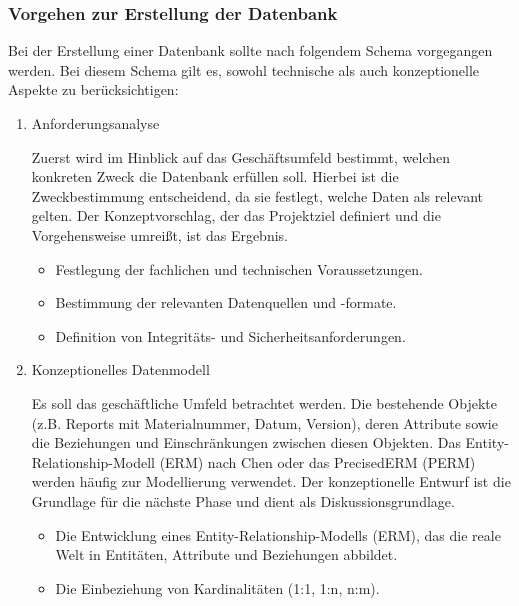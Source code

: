 \subsubsection{Vorgehen zur Erstellung der Datenbank}
Bei der Erstellung einer Datenbank sollte nach folgendem Schema vorgegangen werden.
Bei diesem Schema gilt es, sowohl technische als auch konzeptionelle Aspekte zu berücksichtigen: \cite*[9-11]{Herrmann2018}

\begin{enumerate}

\item
Anforderungsanalyse

Zuerst wird im Hinblick auf das Geschäftsumfeld bestimmt, welchen konkreten Zweck die Datenbank erfüllen soll.
Hierbei ist die Zweckbestimmung  entscheidend, da sie festlegt, welche Daten als relevant gelten.
Der Konzeptvorschlag, der das Projektziel definiert und die Vorgehensweise umreißt, ist das Ergebnis.
\begin{itemize}

\item
Festlegung der fachlichen und technischen Voraussetzungen.
\item
Bestimmung der relevanten Datenquellen und -formate.
\item
Definition von Integritäts- und Sicherheitsanforderungen.

\end{itemize}

\item
Konzeptionelles Datenmodell

Es soll das geschäftliche Umfeld betrachtet werden.
Die bestehende Objekte (z.B. Reports mit Materialnummer, Datum, Version), deren Attribute sowie die Beziehungen und Einschränkungen zwischen diesen Objekten.
Das Entity-Relationship-Modell (ERM) nach Chen oder das PrecisedERM (PERM) werden häufig zur Modellierung verwendet.
Der konzeptionelle Entwurf ist die Grundlage für die nächste Phase und dient als Diskussionsgrundlage.
\begin{itemize}

\item Die Entwicklung eines Entity-Relationship-Modells (ERM), das die reale Welt in Entitäten, Attribute und Beziehungen abbildet.
\item Die Einbeziehung von Kardinalitäten (1:1, 1:n, n:m).


\end{itemize}
\end{enumerate}
